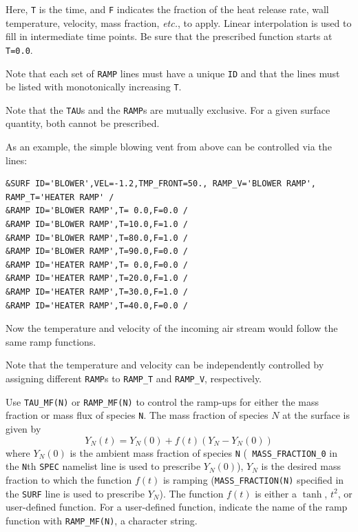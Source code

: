\documentclass[11pt]{book}
\newcommand{\ct}{\tt\small}
\begin{document}
Here, {\ct T} is the time, and {\ct F} indicates the fraction of the heat
release rate, wall temperature, velocity, mass fraction, {\em etc.}, to apply.
Linear interpolation is used to fill in intermediate time points.
Be sure that the prescribed function starts at {\ct T=0.0}.

\begin{warning}
\noindent
Note that each set of {\ct RAMP} lines must have a unique {\ct ID} and that the lines must
be listed with monotonically increasing {\ct T}.
\end{warning}

\begin{warning}
\noindent
Note that the {\ct TAU}s and the {\ct RAMP}s are mutually exclusive. For a given
surface quantity, both cannot be prescribed.
\end{warning}

As an example, the simple blowing vent from above can be controlled via the lines:

\footnotesize
\begin{verbatim}
&SURF ID='BLOWER',VEL=-1.2,TMP_FRONT=50., RAMP_V='BLOWER RAMP', RAMP_T='HEATER RAMP' /
&RAMP ID='BLOWER RAMP',T= 0.0,F=0.0 /
&RAMP ID='BLOWER RAMP',T=10.0,F=1.0 /
&RAMP ID='BLOWER RAMP',T=80.0,F=1.0 /
&RAMP ID='BLOWER RAMP',T=90.0,F=0.0 /
&RAMP ID='HEATER RAMP',T= 0.0,F=0.0 /
&RAMP ID='HEATER RAMP',T=20.0,F=1.0 /
&RAMP ID='HEATER RAMP',T=30.0,F=1.0 /
&RAMP ID='HEATER RAMP',T=40.0,F=0.0 /
\end{verbatim}
\normalsize

\noindent
Now the temperature and velocity of the incoming air stream would
follow the same ramp functions.

\begin{warning}
\noindent
Note that the temperature and
velocity can be independently controlled by assigning different
{\ct RAMP}s to {\ct RAMP\_T} and {\ct RAMP\_V}, respectively.
\end{warning}

Use {\ct TAU\_MF(N)} or {\ct RAMP\_MF(N)}
to control the ramp-ups for either the mass
fraction or mass flux of species {\ct N}.
The mass fraction of species $N$ at the surface is given by
$$ Y_N(t) = Y_N(0) + f(t) \left( Y_N - Y_N(0) \right) $$ where
$Y_N(0)$ is the ambient mass fraction of species {\ct N} ({\ct
MASS\_FRACTION\_0} in the {\ct N}th {\ct SPEC} namelist line is used
to prescribe $Y_N(0)$), $Y_N$ is the desired mass fraction to which
the function $f(t)$ is ramping ({\ct MASS\_FRACTION(N)} specified in
the {\ct SURF} line is used to prescribe $Y_N$).  The function $f(t)$
is either a $\tanh$, $t^2$, or user-defined function. For a
user-defined function, indicate the name of the ramp function with
{\ct RAMP\_MF(N)}, a character string.
\end{document}
